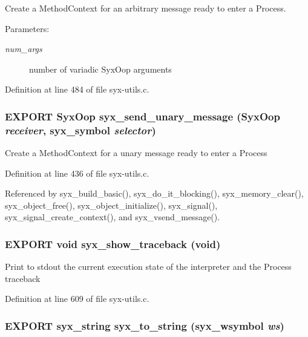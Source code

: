 Create a MethodContext for an arbitrary message ready to enter a Process.

\begin{Desc}
\item[Parameters:]
\begin{description}
\item[{\em num\_\-args}]number of variadic SyxOop arguments \end{description}
\end{Desc}


Definition at line 484 of file syx-utils.c.\hypertarget{syx-utils_8h_d543a115819575f96b987ee4c42594d6}{
\subsubsection{\setlength{\rightskip}{0pt plus 5cm}EXPORT {\bf SyxOop} syx\_\-send\_\-unary\_\-message ({\bf SyxOop} {\em receiver}, \/  {\bf syx\_\-symbol} {\em selector})}}
\label{syx-utils_8h_d543a115819575f96b987ee4c42594d6}


Create a MethodContext for a unary message ready to enter a Process 

Definition at line 436 of file syx-utils.c.

Referenced by syx\_\-build\_\-basic(), syx\_\-do\_\-it\_\-blocking(), syx\_\-memory\_\-clear(), syx\_\-object\_\-free(), syx\_\-object\_\-initialize(), syx\_\-signal(), syx\_\-signal\_\-create\_\-context(), and syx\_\-vsend\_\-message().\hypertarget{syx-utils_8h_82cfea58c47c3a90582124eb1f9c3b4b}{
\subsubsection{\setlength{\rightskip}{0pt plus 5cm}EXPORT void syx\_\-show\_\-traceback (void)}}
\label{syx-utils_8h_82cfea58c47c3a90582124eb1f9c3b4b}


Print to stdout the current execution state of the interpreter and the Process traceback 

Definition at line 609 of file syx-utils.c.\hypertarget{syx-utils_8h_c90ca4dadc5e5807bf91d19cbf96c6a6}{
\subsubsection{\setlength{\rightskip}{0pt plus 5cm}EXPORT {\bf syx\_\-string} syx\_\-to\_\-string ({\bf syx\_\-wsymbol} {\em ws})}}
\label{syx-utils_8h_c90ca4dadc5e5807bf91d19cbf96c6a6}


